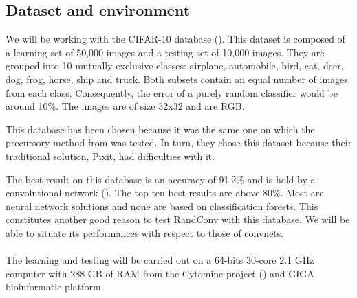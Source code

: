 \documentclass[a4paper]{report}
\begin{document}
	\subsection{Dataset and environment} %
	We will be working with the CIFAR-10 database (\cite{cifar}). This dataset is composed of a learning set of 50,000 images and a testing set of 10,000 images. They are grouped into 10 mutually exclusive classes: airplane, automobile, bird, cat, deer, dog, frog, horse, ship and truck. Both subsets contain an equal number of images from each class. Consequently, the error of a purely random classifier would be around 10\%. The images are of size 32x32 and are RGB.
	\par
	This database has been chosen because it was the same one on which the precursory method from \cite{base} was tested. In turn, they chose this dataset because their traditional solution, Pixit, had difficulties with it. 
	\par
	The best result on this database is an accuracy of 91.2\% and is hold by a convolutional network (\cite{bestcifar}). The top ten best results are above 80\%. Most are neural network solutions and none are based on classification forests. This constitutes another good reason to test RandConv with this database. We will be able to situate its performances with respect to those of convnets.
	\paragraph{}
	The learning and testing will be carried out on a 64-bits 30-core 2.1 GHz computer with 288 GB of RAM from the Cytomine project (\cite{cytomine}) and GIGA bioinformatic platform.
	
	
\end{document}

